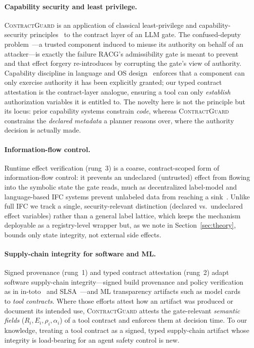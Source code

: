 \documentclass[conference,onecolumn]{IEEEtran}
\theoremstyle{definition}
\newcommand{\racg}{\textsc{RACG}}
\newcommand{\cg}{\textsc{ContractGuard}}
\begin{document}
\paragraph{Capability security and least privilege.}
\cg{} is an application of classical least-privilege and capability-security
principles~\cite{saltzer1975protection,hardy1988confused} to the contract layer
of an LLM gate. The confused-deputy problem~\cite{hardy1988confused}---a trusted
component induced to misuse its authority on behalf of an attacker---is exactly
the failure \racg's admissibility gate is meant to prevent and that effect
forgery re-introduces by corrupting the gate's view of authority. Capability
discipline in language and OS design~\cite{miller2006robust,mettler2010joee}
enforces that a component can only exercise authority it has been explicitly
granted; our typed contract attestation is the contract-layer analogue, ensuring
a tool can only \emph{establish} authorization variables it is entitled to.
The novelty here is not the principle but its locus: prior capability systems
constrain \emph{code}, whereas \cg{} constrains the \emph{declared metadata} a
planner reasons over, where the authority decision is actually made.

\paragraph{Information-flow control.}
Runtime effect verification (rung~3) is a coarse, contract-scoped form of
information-flow control: it prevents an undeclared (untrusted) effect from
flowing into the symbolic state the gate reads, much as decentralized
label-model and language-based IFC systems prevent unlabeled data from reaching a
sink~\cite{myers2000jflow,sabelfeld2003language}. Unlike full IFC we track a
single, security-relevant distinction (declared vs.\ undeclared effect variables)
rather than a general label lattice, which keeps the mechanism deployable as a
registry-level wrapper but, as we note in Section~\ref{sec:theory}, bounds only
state integrity, not external side effects.

\paragraph{Supply-chain integrity for software and ML.}
Signed provenance (rung~1) and typed contract attestation (rung~2) adapt software
supply-chain integrity---signed build provenance and policy verification as in
in-toto~\cite{torres2019intoto} and SLSA~\cite{slsa2023}---and ML transparency
artifacts such as model cards~\cite{mitchell2019modelcards} to \emph{tool
contracts}. Where those efforts attest how an artifact was produced or document
its intended use, \cg{} attests the gate-relevant \emph{semantic fields}
($R_i,E_i,\rho_i,\alpha_i$) of a tool contract and enforces them at decision time.
To our knowledge, treating a tool contract as a signed, typed supply-chain
artifact whose integrity is load-bearing for an agent safety control is new.
\end{document}
